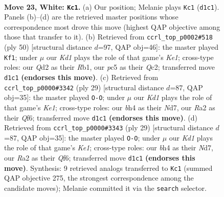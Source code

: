 \documentclass[11pt]{article}
\begin{document}
\clearpage

\begin{figure}[p]\centering
\begin{subfigure}{0.46\textwidth}\centering
\resizebox{\linewidth}{!}{%
\newchessgame
\chessboard[
  setfen={rn1qk2r/5p2/1p1p4/pPpN4/4P2b/5N1P/RP1Q2P1/3K3R w q - 1 23},
  showmover=false,
  pgfstyle=straightmove, color=movearrow, markmove={d1-c1}
]}
\caption{}
\end{subfigure}\hfill
\begin{subfigure}{0.46\textwidth}\centering
\resizebox{\linewidth}{!}{%
\newchessgame
\chessboard[
  setfen={r1b2k1r/p3bpq1/2p5/2Pp4/P2N3p/3BP3/2Q2PP1/1R2K2R w K - 2 26},
  showmover=false,
  pgfstyle=straightmove, color=movearrow, markmove={e1-f1}
]}
\caption{}
\end{subfigure}
\\[4pt]
\begin{subfigure}{0.46\textwidth}\centering
\resizebox{\linewidth}{!}{%
\newchessgame
\chessboard[
  setfen={r3k2r/pp1nn1p1/5q1p/3p4/3Pp3/2P2P1N/P5PP/R1BQ1RK1 b kq - 0 15},
  showmover=false,
  pgfstyle=straightmove, color=movearrow, markmove={e8-g8}
]}
\caption{}
\end{subfigure}\hfill
\begin{subfigure}{0.46\textwidth}\centering
\resizebox{\linewidth}{!}{%
\newchessgame
\chessboard[
  setfen={r3k2r/pp1nn1p1/5q1p/3p4/3Pp3/2P2P1N/P5PP/R1BQ1RK1 b kq - 0 15},
  showmover=false,
  pgfstyle=straightmove, color=movearrow, markmove={e8-g8}
]}
\caption{}
\end{subfigure}
\caption{\textbf{Move 23, White: \texttt{Kc1}.} (a) Our position; Melanie plays \texttt{Kc1} (\texttt{d1c1}). Panels (b)--(d) are the retrieved master positions whose correspondence most drove this move (highest QAP objective among those that transfer to it). (b) Retrieved from \texttt{ccrl\_top\_p0002\#518} (ply 50) [structural distance $d$=97, QAP obj=46]: the master played \texttt{Kf1}; under $\mu$ our \emph{Kd1} plays the role of that game's \emph{Ke1}; cross-type roles: our \emph{Q}d2 as their \emph{R}b1, our \emph{p}c5 as their \emph{Q}c2; transferred move \texttt{d1c1} \textbf{(endorses this move)}. (c) Retrieved from \texttt{ccrl\_top\_p0000\#3342} (ply 29) [structural distance $d$=87, QAP obj=35]: the master played \texttt{O-O}; under $\mu$ our \emph{Kd1} plays the role of that game's \emph{Ke1}; cross-type roles: our \emph{b}h4 as their \emph{N}d7, our \emph{R}a2 as their \emph{Q}f6; transferred move \texttt{d1c1} \textbf{(endorses this move)}. (d) Retrieved from \texttt{ccrl\_top\_p0000\#3343} (ply 29) [structural distance $d$=87, QAP obj=35]: the master played \texttt{O-O}; under $\mu$ our \emph{Kd1} plays the role of that game's \emph{Ke1}; cross-type roles: our \emph{b}h4 as their \emph{N}d7, our \emph{R}a2 as their \emph{Q}f6; transferred move \texttt{d1c1} \textbf{(endorses this move)}. Synthesis: 9 retrieved analogs transferred to \texttt{Kc1} (summed QAP objective 275, the strongest correspondence among the candidate moves); Melanie committed it via the \texttt{search} selector.}
\label{fig:thought-m44}
\end{figure}
\end{document}
